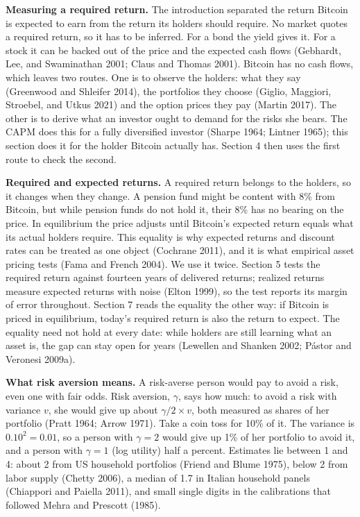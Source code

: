 \documentclass[11pt]{article}
\begin{document}
\textbf{Measuring a required return.} The introduction separated the return Bitcoin is expected to earn from the return its holders should require. No market quotes a required return, so it has to be inferred. For a bond the yield gives it. For a stock it can be backed out of the price and the expected cash flows (Gebhardt, Lee, and Swaminathan 2001; Claus and Thomas 2001). Bitcoin has no cash flows, which leaves two routes. One is to observe the holders: what they say (Greenwood and Shleifer 2014), the portfolios they choose (Giglio, Maggiori, Stroebel, and Utkus 2021) and the option prices they pay (Martin 2017). The other is to derive what an investor ought to demand for the risks she bears. The CAPM does this for a fully diversified investor (Sharpe 1964; Lintner 1965); this section does it for the holder Bitcoin actually has. Section 4 then uses the first route to check the second.

\textbf{Required and expected returns.} A required return belongs to the holders, so it changes when they change. A pension fund might be content with 8\% from Bitcoin, but while pension funds do not hold it, their 8\% has no bearing on the price. In equilibrium the price adjusts until Bitcoin's expected return equals what its actual holders require. This equality is why expected returns and discount rates can be treated as one object (Cochrane 2011), and it is what empirical asset pricing tests (Fama and French 2004). We use it twice. Section 5 tests the required return against fourteen years of delivered returns; realized returns measure expected returns with noise (Elton 1999), so the test reports its margin of error throughout. Section 7 reads the equality the other way: if Bitcoin is priced in equilibrium, today's required return is also the return to expect. The equality need not hold at every date: while holders are still learning what an asset is, the gap can stay open for years (Lewellen and Shanken 2002; P\'astor and Veronesi 2009a).

\textbf{What risk aversion means.} A risk-averse person would pay to avoid a risk, even one with fair odds. Risk aversion, $\gamma$, says how much: to avoid a risk with variance $v$, she would give up about $\gamma/2 \times v$, both measured as shares of her portfolio (Pratt 1964; Arrow 1971). Take a coin toss for 10\% of it. The variance is $0.10^2 = 0.01$, so a person with $\gamma = 2$ would give up 1\% of her portfolio to avoid it, and a person with $\gamma = 1$ (log utility) half a percent. Estimates lie between 1 and 4: about 2 from US household portfolios (Friend and Blume 1975), below 2 from labor supply (Chetty 2006), a median of 1.7 in Italian household panels (Chiappori and Paiella 2011), and small single digits in the calibrations that followed Mehra and Prescott (1985).
\end{document}

